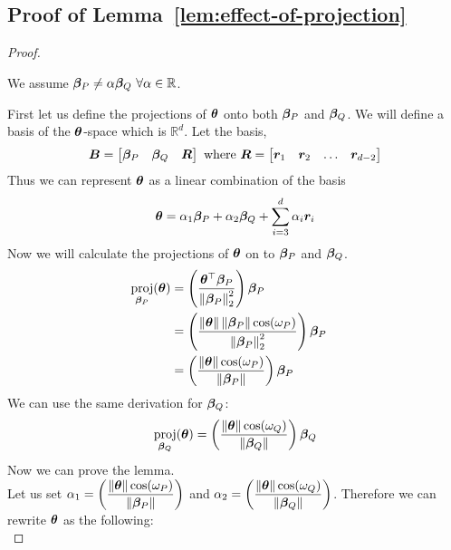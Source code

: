 \documentclass{article} %
\DeclareMathOperator{\proj}{proj}
\newcommand{\norm}[1]{\left\lVert#1\right\rVert}
\begin{document}
\begin{appendices}
	\subsection{Proof of Lemma~\ref{lem:effect-of-projection}}
	\label{app:effect-of-projection}
	\begin{proof}
		\begin{assumption}
			\label{asm:p-q-linear-independence}
			We assume ${\bm{\beta}}_P \neq \alpha {\bm{\beta}}_Q\,\, \forall \alpha \in \mathbb{R}$.
		\end{assumption}
		First let us define the projections of ${\bm{\theta}}$ onto both ${\bm{\beta}}_P$ and ${\bm{\beta}}_Q$. We will define a basis of the ${\bm{\theta}}$-space which is $\mathbb{R}^d$. Let the basis,
		\begin{equation}
			{\bm{B}} = \begin{bmatrix} {\bm{\beta}}_P & {\bm{\beta}}_Q & {\bm{R}} \end{bmatrix} \text{ where } {\bm{R}}= \begin{bmatrix}	{\bm{r}}_1 & {\bm{r}}_2 & \dots & {\bm{r}}_{d-2} \end{bmatrix}
		\end{equation}
		Thus we can represent ${\bm{\theta}}$ as a linear combination of the basis 
		\begin{equation}
			{\bm{\theta}} = \alpha_1 {\bm{\beta}}_P + \alpha_2 {\bm{\beta}}_Q + \sum_{i=3}^d \alpha_i {\bm{r}}_i 
		\end{equation}
		Now we will calculate the projections of ${\bm{\theta}}$ on to ${\bm{\beta}}_P$ and ${\bm{\beta}}_Q$.
		\begin{align*}
			\proj_{\vbeta_P}(\vtheta) &= \left(\frac{\vtheta^\top \vbeta_P}{\norm{\vbeta_P}^2_2}\right)\vbeta_P &&\\
			&= \left(\frac{\norm{\vtheta}\norm{\vbeta_P}\cos(\omega_P)}{\norm{\vbeta_P}^2_2}\right)\vbeta_P &&\\
			&= \left(\frac{\norm{\vtheta}\cos(\omega_P)}{\norm{\vbeta_P}}\right)\vbeta_P &&
		\end{align*}
		We can use the same derivation for ${\bm{\beta}}_Q$:
		\begin{equation}
			\proj_{\vbeta_Q}(\vtheta) = \left(\frac{\norm{\vtheta}\cos(\omega_Q)}{\norm{\vbeta_Q}}\right)\vbeta_Q
		\end{equation}
		Now we can prove the lemma.\\
		Let us set $\displaystyle \alpha_1 = \left(\frac{\norm{\vtheta}\cos(\omega_P)}{\norm{\vbeta_P}}\right)$ and $\displaystyle \alpha_2 = \left(\frac{\norm{\vtheta}\cos(\omega_Q)}{\norm{\vbeta_Q}}\right)$. Therefore we can rewrite ${\bm{\theta}}$ as the following:
		\begin{equation}

\end{equation}
\end{proof}
\end{appendices}
\end{document}
